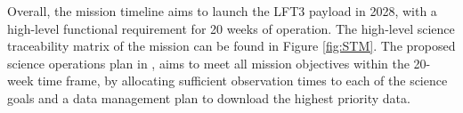 Overall, the mission timeline aims to launch the LFT3 payload in 2028, with a high-level functional requirement for 20 weeks of operation. The high-level science traceability matrix of the mission can be found in Figure \ref{fig:STM}. The proposed science operations plan in \cite{prabu2025lft3}, aims to meet all mission objectives within the 20-week time frame, by allocating sufficient observation times to each of the science goals and a data management plan to download the highest priority data.

